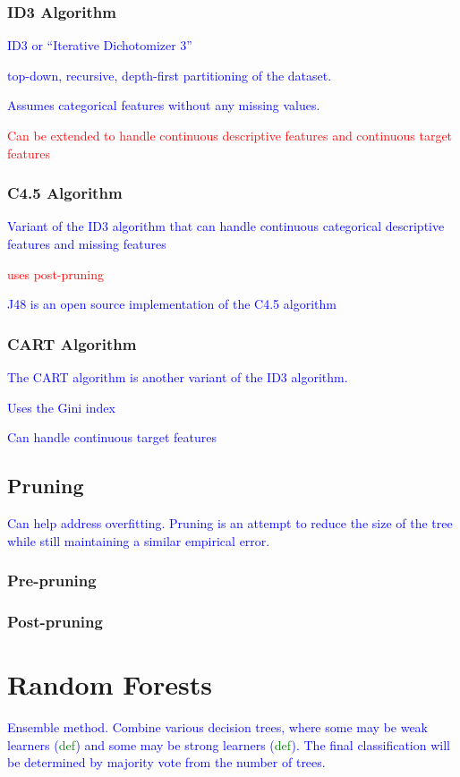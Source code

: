 \subsubsection{ID3 Algorithm}

\textcolor{blue}{ID3 or ``Iterative Dichotomizer 3''}


\textcolor{blue}{top-down, recursive, depth-first partitioning of the dataset.}

\textcolor{blue}{Assumes categorical features without any missing values.}

\textcolor{red}{Can be extended to handle continuous descriptive features and continuous target features}

\subsubsection{C4.5 Algorithm}

\textcolor{blue}{Variant of the {ID3 algorithm} that can handle continuous categorical descriptive features and missing features}

\textcolor{red}{uses post-pruning}

\textcolor{blue}{{J48} is an open source implementation of the C4.5 algorithm}

\subsubsection{CART Algorithm}

\textcolor{blue}{The CART algorithm is another variant of the ID3 algorithm.}

\textcolor{blue}{Uses the Gini index}

\textcolor{blue}{Can handle continuous target features}

\subsection{Pruning}

\textcolor{blue}{Can help address overfitting. Pruning is an attempt to reduce the size of the tree while still maintaining a similar empirical error.}

\subsubsection{Pre-pruning}

\subsubsection{Post-pruning}

\section{Random Forests}

\textcolor{blue}{Ensemble method. Combine various decision trees, where some may be weak learners (\textcolor{green}{def}) and some may be strong learners (\textcolor{green}{def}). The final classification will be determined by majority vote from the number of trees.}



